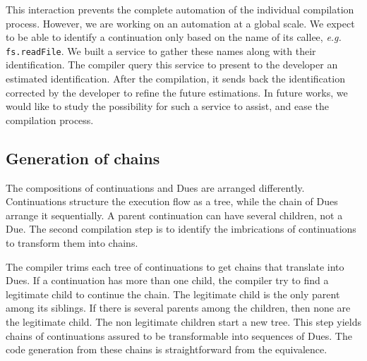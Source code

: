 This interaction prevents the complete automation of the individual compilation process.
However, we are working on an automation at a global scale.
We expect to be able to identify a continuation only based on the name of its callee, \textit{e.g.} \texttt{fs.readFile}.
We built a service to gather these names along with their identification.
The compiler query this service to present to the developer an estimated identification.
After the compilation, it sends back the identification corrected by the developer to refine the future estimations.
In future works, we would like to study the possibility for such a service to assist, and ease the compilation process.

\subsection{Generation of chains}

The compositions of continuations and Dues are arranged differently.
Continuations structure the execution flow as a tree, while the chain of Dues arrange it sequentially.
A parent continuation can have several children, not a Due.
The second compilation step is to identify the imbrications of continuations to transform them into chains.

The compiler trims each tree of continuations to get chains that translate into Dues.
If a continuation has more than one child, the compiler try to find a legitimate child to continue the chain.
The legitimate child is the only parent among its siblings.
If there is several parents among the children, then none are the legitimate child.
The non legitimate children start a new tree.
This step yields chains of continuations assured to be transformable into sequences of Dues.
The code generation from these chains is straightforward from the equivalence.







